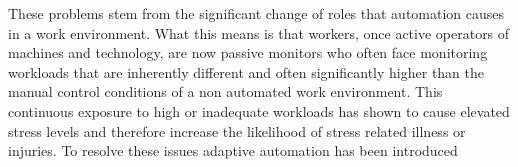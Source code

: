 These problems stem from the significant change of roles that automation causes in a work environment. What this means is that workers, once active operators of machines and technology, are now passive monitors who often face monitoring workloads that are inherently different and often significantly higher than the manual control conditions of a non automated work environment. This continuous exposure to high or inadequate workloads has shown to cause elevated stress levels and therefore increase the likelihood of stress related illness or injuries.
To resolve these issues adaptive automation has been introduced


%
%




